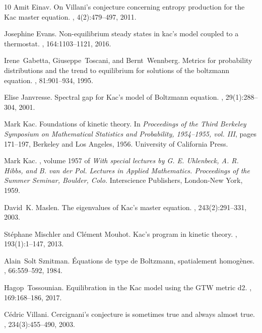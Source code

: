 \documentclass{article}
\begin{document}
\begin{thebibliography}{10}
	Amit Einav.
	\newblock On {V}illani's conjecture concerning entropy production for the {K}ac
	master equation.
	, 4(2):479--497, 2011.
	
	Josephine Evans.
	\newblock Non-equilibrium steady states in kac’s model coupled to a
	thermostat.
	, 164:1103--1121, 2016.
	
	Irene~Gabetta, Giuseppe~Toscani, and Bernt~Wennberg.
	\newblock Metrics for probability distributions and the trend to equilibrium
	for solutions of the boltzmann equation.
	, 81:901--934, 1995.
	
	Elise Janvresse.
	\newblock Spectral gap for {K}ac's model of {B}oltzmann equation.
	, 29(1):288--304, 2001.
	
	Mark Kac.
	\newblock Foundations of kinetic theory.
	\newblock In {\em Proceedings of the {T}hird {B}erkeley {S}ymposium on
		{M}athematical {S}tatistics and {P}robability, 1954--1955, vol. {III}}, pages
	171--197, Berkeley and Los Angeles, 1956. University of California Press.
	
	Mark Kac.
	, volume
	1957 of {\em With special lectures by G. E. Uhlenbeck, A. R. Hibbs, and B.
		van der Pol. Lectures in Applied Mathematics. Proceedings of the Summer
		Seminar, Boulder, Colo.}
	\newblock Interscience Publishers, London-New York, 1959.
	
	David~K. Maslen.
	\newblock The eigenvalues of {K}ac's master equation.
	, 243(2):291--331, 2003.
	
	St\'ephane Mischler and Cl\'ement Mouhot.
	\newblock Kac's program in kinetic theory.
	, 193(1):1--147, 2013.
	
	Alain~Solt Sznitman.
	\newblock Équations de type de Boltzmann, spatialement homogènes.
	, 66:559--592, 1984.
	
	Hagop~Tossounian.
	\newblock Equilibration in the {K}ac model using the GTW metric d2.
	, 169:168--186, 2017.
	
	C{\'e}dric Villani.
	\newblock Cercignani's conjecture is sometimes true and always almost true.
	, 234(3):455--490, 2003.
	
\end{thebibliography}
\end{document}

